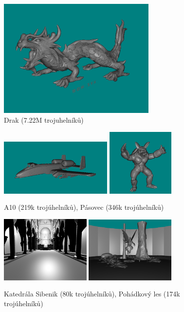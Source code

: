 \documentclass[report,11pt]{elsarticle}
\begin{document}
\begin{figure}[!ht]
\begin{center}
  \includegraphics[width=0.7\textwidth]{dragon}
\caption{{\label{fig:fig2}}Drak (7.22M trojuhelníků)}
\end{center}
\end{figure}

\begin{figure}[!ht]
\begin{center}
  \includegraphics[width=0.5\textwidth]{A10}
  \includegraphics[width=0.3\textwidth]{armadillo}
\caption{{\label{fig:fig3}}A10 (219k trojúhelníků), Pásovec (346k trojúhelníků)}
\end{center}
\end{figure}

\begin{figure}[!ht]
\begin{center}
  \includegraphics[width=0.4\textwidth]{sibenik}
  \includegraphics[width=0.4\textwidth]{fforest}
\caption{{\label{fig:fig4}}Katedrála Sibenik (80k trojúhelníků), Pohádkový les (174k trojúhelníků)}
\end{center}
\end{figure}
\end{document}
